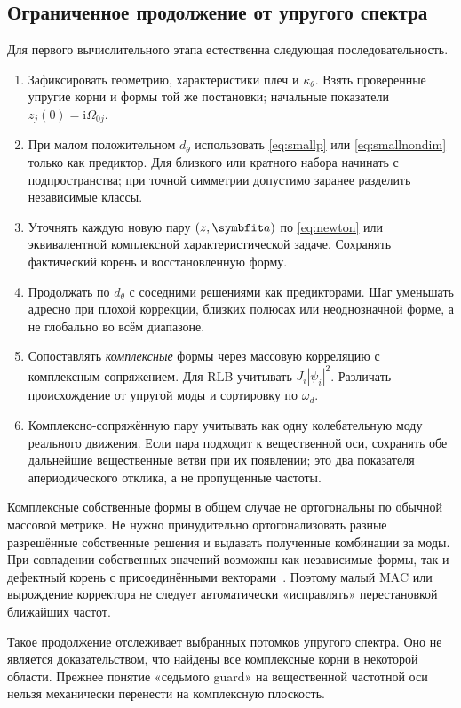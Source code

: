 \documentclass[11pt,a4paper]{article}
\numberwithin{equation}{section}
\newcommand{\ii}{\mathrm i}
\begin{document}
\subsection{Ограниченное продолжение от упругого спектра}

Для первого вычислительного этапа естественна следующая последовательность.
\begin{enumerate}
\item Зафиксировать геометрию, характеристики плеч и $\kappa_\theta$.
      Взять проверенные упругие корни и формы той же постановки;
      начальные показатели $z_j(0)=\ii\Omega_{0j}$.
\item При малом положительном $d_\theta$ использовать
      \eqref{eq:smallp} или \eqref{eq:smallnondim} только как предиктор.
      Для близкого или кратного набора начинать с подпространства;
      при точной симметрии допустимо заранее разделить независимые классы.
\item Уточнять каждую новую пару $(z,\symbfit a)$ по
      \eqref{eq:newton} или эквивалентной комплексной характеристической
      задаче. Сохранять фактический корень и восстановленную форму.
\item Продолжать по $d_\theta$ с соседними решениями как предикторами.
      Шаг уменьшать адресно при плохой коррекции, близких полюсах
      или неоднозначной форме, а не глобально во всём диапазоне.
\item Сопоставлять \emph{комплексные} формы через массовую корреляцию
      с комплексным сопряжением. Для RLB учитывать $J_i|\psi_i|^2$.
      Различать происхождение от упругой моды и сортировку по $\omega_d$.
\item Комплексно-сопряжённую пару учитывать как одну колебательную
      моду реального движения. Если пара подходит к вещественной оси,
      сохранять обе дальнейшие вещественные ветви при их появлении;
      это два показателя апериодического отклика, а не пропущенные частоты.
\end{enumerate}

Комплексные собственные формы в общем случае не ортогональны по обычной
массовой метрике. Не нужно принудительно ортогонализовать разные
разрешённые собственные решения и выдавать полученные комбинации за моды.
При совпадении собственных значений возможны как независимые формы,
так и дефектный корень с присоединёнными векторами~\cite{tisseur2001}.
Поэтому малый MAC или вырождение корректора не следует автоматически
«исправлять» перестановкой ближайших частот.

Такое продолжение отслеживает выбранных потомков упругого спектра.
Оно не является доказательством, что найдены все комплексные корни
в некоторой области. Прежнее понятие «седьмого guard» на вещественной
частотной оси нельзя механически перенести на комплексную плоскость.
\end{document}

